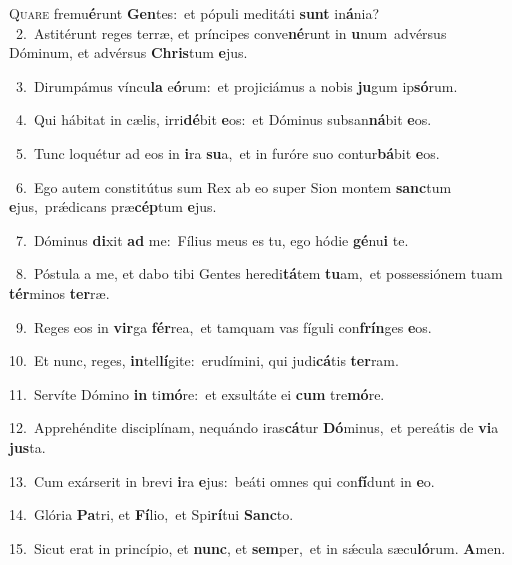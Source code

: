 \lettrine{\initial\textcolor{\initialcolor}{Q}}{uare} fremu\-\textbf{é}\-runt \textbf{Gen}\-tes:~\star et pópuli meditáti \textbf{sunt} in\-\textbf{á}\-nia?\\
{\numbfont\textcolor{\numbcolor}{~2.}}~Astitérunt reges terræ, et príncipes conve\-\textbf{né}\-runt in \textbf{u}\-num~\star advérsus Dóminum, et advérsus \textbf{Chris}\-tum \textbf{e}\-jus.\par
{\numbfont\textcolor{\numbcolor}{~3.}}~Dirumpámus víncu\textbf{la} e\-\textbf{ó}\-rum:~\star et projiciámus a nobis \textbf{ju}\-gum ip\-\textbf{só}\-rum.\par
{\numbfont\textcolor{\numbcolor}{~4.}}~Qui hábitat in cælis, irri\-\textbf{dé}\-bit \textbf{e}\-os:~\star et Dóminus subsan\-\textbf{ná}\-bit \textbf{e}\-os.\par
{\numbfont\textcolor{\numbcolor}{~5.}}~Tunc loquétur ad eos in \textbf{i}\-ra \textbf{su}\-a,~\star et in furóre suo contur\-\textbf{bá}\-bit \textbf{e}\-os.\par
{\numbfont\textcolor{\numbcolor}{~6.}}~Ego autem constitútus sum Rex ab eo super Sion montem \textbf{sanc}\-tum \textbf{e}\-jus,~\star prǽdicans præ\-\textbf{cép}\-tum \textbf{e}\-jus.\par
{\numbfont\textcolor{\numbcolor}{~7.}}~Dóminus \textbf{di}\-xit \textbf{ad} me:~\star Fílius meus es tu, ego hódie \textbf{gé}\-nu\textbf{i} te.\par
{\numbfont\textcolor{\numbcolor}{~8.}}~Póstula a me, et dabo tibi Gentes heredi\-\textbf{tá}\-tem \textbf{tu}\-am,~\star et possessiónem tuam \textbf{tér}\-minos \textbf{ter}\-ræ.\par
{\numbfont\textcolor{\numbcolor}{~9.}}~Reges eos in \textbf{vir}\-ga \textbf{fér}\-rea,~\star et tamquam vas fíguli con\-\textbf{frín}\-ges \textbf{e}\-os.\par
{\numbfont\textcolor{\numbcolor}{10.}}~Et nunc, reges, \textbf{in}\-tel\-\textbf{lí}\-gite:~\star erudímini, qui judi\-\textbf{cá}\-tis \textbf{ter}\-ram.\par
{\numbfont\textcolor{\numbcolor}{11.}}~Servíte Dómino \textbf{in} ti\-\textbf{mó}\-re:~\star et exsultáte ei \textbf{cum} tre\-\textbf{mó}\-re.\par
{\numbfont\textcolor{\numbcolor}{12.}}~Apprehéndite disciplínam, nequándo iras\-\textbf{cá}\-tur \textbf{Dó}\-minus,~\star et pereátis de \textbf{vi}\-a \textbf{jus}\-ta.\par
{\numbfont\textcolor{\numbcolor}{13.}}~Cum exárserit in brevi \textbf{i}\-ra \textbf{e}\-jus:~\star beáti omnes qui con\-\textbf{fí}\-dunt in \textbf{e}\-o.\par
{\numbfont\textcolor{\numbcolor}{14.}}~Glória \textbf{Pa}\-tri, et \textbf{Fí}\-lio,~\star et Spi\-\textbf{rí}\-tui \textbf{Sanc}\-to.\par
{\numbfont\textcolor{\numbcolor}{15.}}~Sicut erat in princípio, et \textbf{nunc}\-, et \textbf{sem}\-per,~\star et in sǽcula sæcu\-\textbf{ló}\-rum. \textbf{A}\-men.\par

